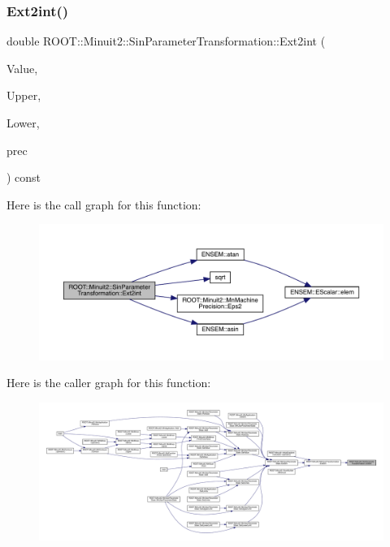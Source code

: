 \subsubsection{\texorpdfstring{Ext2int()}{Ext2int()}\hspace{0.1cm}{\footnotesize\ttfamily [2/2]}}
{\footnotesize\ttfamily double R\+O\+O\+T\+::\+Minuit2\+::\+Sin\+Parameter\+Transformation\+::\+Ext2int (\begin{DoxyParamCaption}\item[{double}]{Value,  }\item[{double}]{Upper,  }\item[{double}]{Lower,  }\item[{const \mbox{\hyperlink{classROOT_1_1Minuit2_1_1MnMachinePrecision}{Mn\+Machine\+Precision}} \&}]{prec }\end{DoxyParamCaption}) const}

Here is the call graph for this function\+:\nopagebreak
\begin{figure}[H]
\begin{center}
\leavevmode
\includegraphics[width=350pt]{de/d62/classROOT_1_1Minuit2_1_1SinParameterTransformation_a5a98af7b966742b4d3c90ab6d6bbeb5a_cgraph}
\end{center}
\end{figure}
Here is the caller graph for this function\+:\nopagebreak
\begin{figure}[H]
\begin{center}
\leavevmode
\includegraphics[width=350pt]{de/d62/classROOT_1_1Minuit2_1_1SinParameterTransformation_a5a98af7b966742b4d3c90ab6d6bbeb5a_icgraph}
\end{center}
\end{figure}
\mbox{\label{classROOT_1_1Minuit2_1_1SinParameterTransformation_a53590482bc5734d9f079c8c5054d3de6}} 
